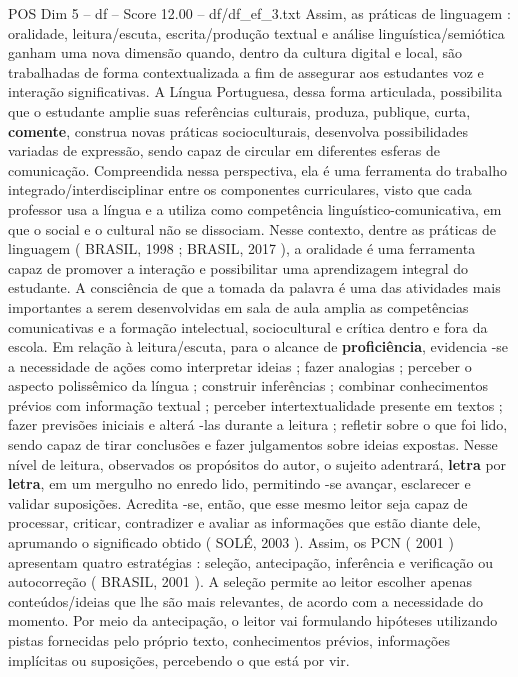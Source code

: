 \begin{textsample}{POS Dim 5 – df – Score 12.00 – df/df\_ef\_3.txt}
Assim, as práticas de linguagem : oralidade, leitura/escuta, escrita/produção textual e análise linguística/semiótica ganham uma nova dimensão quando, dentro da cultura digital e local, são trabalhadas de forma contextualizada a fim de assegurar aos estudantes voz e interação significativas.
A Língua Portuguesa, dessa forma articulada, possibilita que o estudante amplie suas referências culturais, produza, publique, curta, \textbf{comente}, construa novas práticas socioculturais, desenvolva possibilidades variadas de expressão, sendo capaz de circular em diferentes esferas de comunicação.
Compreendida nessa perspectiva, ela é uma ferramenta do trabalho integrado/interdisciplinar entre os componentes curriculares, visto que cada professor usa a língua e a utiliza como competência linguístico-comunicativa, em que o social e o cultural não se dissociam.
Nesse contexto, dentre as práticas de linguagem ( BRASIL, 1998 ; BRASIL, 2017 ), a oralidade é uma ferramenta capaz de promover a interação e possibilitar uma aprendizagem integral do estudante.
A consciência de que a tomada da palavra é uma das atividades mais importantes a serem desenvolvidas em sala de aula amplia as competências comunicativas e a formação intelectual, sociocultural e crítica dentro e fora da escola.
Em relação à leitura/escuta, para o alcance de \textbf{proficiência}, evidencia -se a necessidade de ações como interpretar ideias ; fazer analogias ; perceber o aspecto polissêmico da língua ; construir inferências ; combinar conhecimentos prévios com informação textual ; perceber intertextualidade presente em textos ; fazer previsões iniciais e alterá -las durante a leitura ; refletir sobre o que foi lido, sendo capaz de tirar conclusões e fazer julgamentos sobre ideias expostas.
Nesse nível de leitura, observados os propósitos do autor, o sujeito adentrará, \textbf{letra} por \textbf{letra}, em um mergulho no enredo lido, permitindo -se avançar, esclarecer e validar suposições.
Acredita -se, então, que esse mesmo leitor seja capaz de processar, criticar, contradizer e avaliar as informações que estão diante dele, aprumando o significado obtido ( SOLÉ, 2003 ).
Assim, os PCN ( 2001 ) apresentam quatro estratégias : seleção, antecipação, inferência e verificação ou autocorreção ( BRASIL, 2001 ).
A seleção permite ao leitor escolher apenas conteúdos/ideias que lhe são mais relevantes, de acordo com a necessidade do momento.
Por meio da antecipação, o leitor vai formulando hipóteses utilizando pistas fornecidas pelo próprio texto, conhecimentos prévios, informações implícitas ou suposições, percebendo o que está por vir.

\end{textsample}
